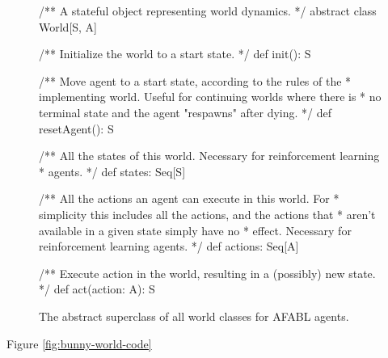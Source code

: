 \begin{figure}[ht]
\begin{center}

\begin{lstlisting}[language=Scala]
\end{lstlisting}
/** A stateful object representing world dynamics.
  */
abstract class World[S, A] {

  /** Initialize the world to a start state.
    */
  def init(): S

  /** Move agent to a start state, according to the rules of the
    * implementing world. Useful for continuing worlds where there is
    * no terminal state and the agent "respawns" after dying.
    */
  def resetAgent(): S

  /** All the states of this world. Necessary for reinforcement learning
    * agents.
    */
  def states: Seq[S]

  /** All the actions an agent can execute in this world.  For
    * simplicity this includes all the actions, and the actions that
    * aren't available in a given state simply have no
    * effect. Necessary for reinforcement learning agents.
    */
  def actions: Seq[A]

  /** Execute action in the world, resulting in a (possibly) new state.
   */
  def act(action: A): S
}
\caption{The abstract superclass of all world classes for AFABL agents.}
\end{center}
\label{fig:world-code}
\end{figure}

Figure \ref{fig:bunny-world-code}

